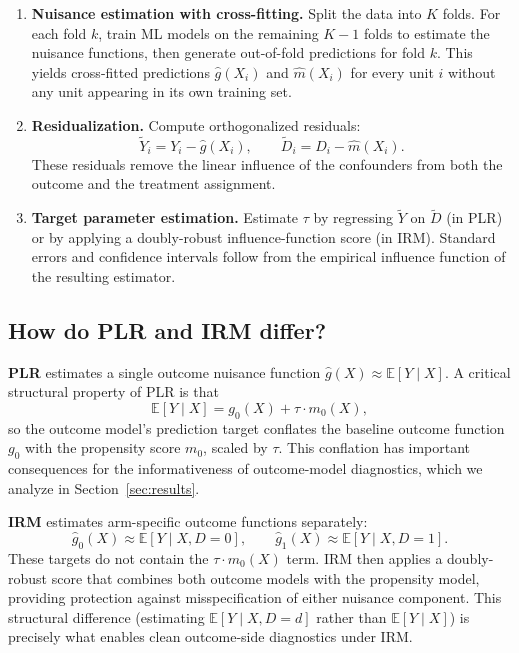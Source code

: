 \documentclass[12pt]{article}
\begin{document}
\begin{enumerate}
  \item \textbf{Nuisance estimation with cross-fitting.} Split the data into $K$ folds. For each fold $k$, train ML models on the remaining $K-1$ folds to estimate the nuisance functions, then generate out-of-fold predictions for fold $k$. This yields cross-fitted predictions $\hat{g}(X_i)$ and $\hat{m}(X_i)$ for every unit $i$ without any unit appearing in its own training set.

  \item \textbf{Residualization.} Compute orthogonalized residuals:
  \[
    \tilde{Y}_i = Y_i - \hat{g}(X_i), \qquad \tilde{D}_i = D_i - \hat{m}(X_i).
  \]
  These residuals remove the linear influence of the confounders from both the outcome and the treatment assignment.

  \item \textbf{Target parameter estimation.} Estimate $\tau$ by regressing $\tilde{Y}$ on $\tilde{D}$ (in PLR) or by applying a doubly-robust influence-function score (in IRM). Standard errors and confidence intervals follow from the empirical influence function of the resulting estimator.
\end{enumerate}

\subsection{How do PLR and IRM differ?}

\textbf{PLR} estimates a single outcome nuisance function $\hat{g}(X) \approx \mathbb{E}[Y \mid X]$. A critical structural property of PLR is that
\[
  \mathbb{E}[Y \mid X] = g_0(X) + \tau \cdot m_0(X),
\]
so the outcome model's prediction target conflates the baseline outcome function $g_0$ with the propensity score $m_0$, scaled by $\tau$. This conflation has important consequences for the informativeness of outcome-model diagnostics, which we analyze in Section~\ref{sec:results}.

\noindent\textbf{IRM} estimates arm-specific outcome functions separately:
\[
  \hat{g}_0(X) \approx \mathbb{E}[Y \mid X, D=0], \qquad \hat{g}_1(X) \approx \mathbb{E}[Y \mid X, D=1].
\]
These targets do not contain the $\tau \cdot m_0(X)$ term. IRM then applies a doubly-robust score that combines both outcome models with the propensity model, providing protection against misspecification of either nuisance component. This structural difference (estimating $\mathbb{E}[Y \mid X, D=d]$ rather than $\mathbb{E}[Y \mid X]$) is precisely what enables clean outcome-side diagnostics under IRM.
\end{document}
